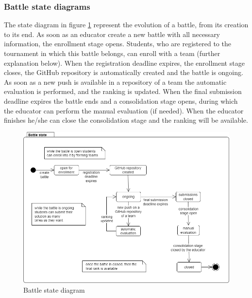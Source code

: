 \subsubsection*{Battle state diagrams}
The state diagram in figure \ref{fig:battle_state} represent the evolution of a battle, from its creation to its end. \newline
As soon as an educator create a new battle with all necessary information, the enrollment stage opens. Students, who are registered to the tournament in which this battle belongs, can enroll with a team (further explanation below). \newline
When the registration deadline expires, the enrollment stage closes, the GitHub repository is automatically created and the battle is ongoing. As soon as a new push is available in a repository of a team the automatic evaluation is performed, and the ranking is updated. \newline
When the final submission deadline expires the battle ends and a consolidation stage opens, during which the educator can perform the manual evaluation (if needed). When the educator finishes he/she can close the consolidation stage and the ranking will be available.
\begin{figure}[H]
    \centering
    \includegraphics[scale=0.5]{images/battle_state.png}
    \caption{Battle state diagram}
    \label{fig:battle_state}
\end{figure}

